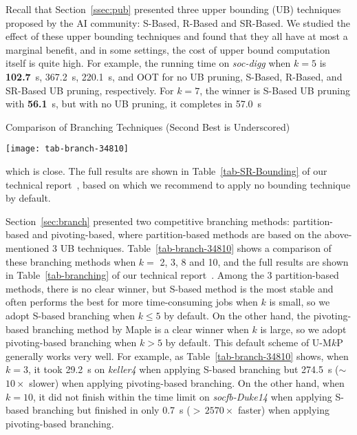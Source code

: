 \documentclass[sigconf, nonacm]{acmart}
\begin{document}
\vspace{1mm}
Recall that Section~\ref{ssec:pub} presented three upper bounding (UB) techniques proposed by the AI community: S-Based, R-Based and SR-Based. We studied the effect of these upper bounding techniques and found that they all have at most a marginal benefit, and in some settings, the cost of upper bound computation itself is quite high. For example, the running time on \textit{soc-digg} when $k=5$ is \textbf{102.7}~s, 367.2~s, 220.1~s, and OOT for no UB pruning, S-Based, R-Based, and SR-Based UB pruning, respectively. For $k=7$, the winner is S-Based UB pruning with \textbf{56.1}~s, but with no UB pruning, it completes in 57.0~s 
\begin{wraptable}[14]{r}[\dimexpr\columnwidth+\columnsep\relax]{11.9cm}
    \centering
    \vspace{-4.5mm}
    \caption{Comparison of Branching Techniques (Second Best is Underscored)}\label{tab-branch-34810}
    \vspace{-3.5mm}
    \texttt{[image: tab-branch-34810]}
\end{wraptable}
which is close. The full results are shown in Table~\ref{tab-SR-Bounding} of our technical report~\cite{tech_report}, based on which we recommend to apply no bounding technique by default.

\vspace{1mm}
Section~\ref{sec:branch} presented two competitive branching methods: partition-based and pivoting-based, where partition-based methods are based on the above-mentioned 3 UB techniques. Table~\ref{tab-branch-34810} shows a comparison of these branching methods when $k=$ 2, 3, 8 and 10, and the full results are shown in Table~\ref{tab-branching} of our technical report~\cite{tech_report}.
%
Among the 3 partition-based methods, there is no clear winner, but S-based method is the most stable and often performs the best for more time-consuming jobs when $k$ is small, so we adopt S-based branching when $k\leq 5$ by default. On the other hand, the pivoting-based branching method by Maple is a clear winner when $k$ is large, so we adopt pivoting-based branching when $k>5$ by default. This default scheme of U-M$k$P generally works very well. For example, as Table~\ref{tab-branch-34810} shows, when $k=3$, it took 29.2~s on \textit{keller4} when applying S-based branching but 274.5~s ($\sim$$10\times$ slower) when applying pivoting-based branching. On the other hand, when $k=10$, it did not finish within the time limit on \textit{socfb-Duke14} when applying S-based branching but finished in only 0.7~s ($>$\,$2570\times$ faster) when applying pivoting-based branching.
\end{document}
